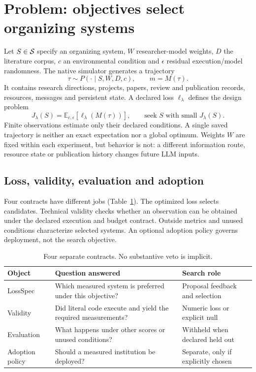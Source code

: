 \section{Problem: objectives select organizing systems}
\label{sec:problem}
Let $S\in\mathcal{S} $ specify an organizing system, $W$ researcher-model weights, $D$
the literature corpus, $ c $ an environmental condition and $\epsilon $ residual
execution/model randomness. The native simulator generates a trajectory
\begin{equation}
 \tau\sim P(\cdot\mid S,W,D,c),\qquad m=M(\tau).
\end{equation}
It contains research directions, projects, papers, review and publication
records, resources, messages and persistent state. A declared loss $\ell_\lambda $
defines the design problem
\begin{equation}
 J_\lambda(S)=\mathbb E_{c,\epsilon}[\ell_\lambda(M(\tau))],\qquad
 \text{seek }S\text{ with small }J_\lambda(S).
 \label{eq:integrated-objective}
\end{equation}
Finite observations estimate only their declared conditions. A single saved
trajectory is neither an exact expectation nor a global optimum. Weights $W$
are fixed within each experiment, but behavior is not: a different information
route, resource state or publication history changes future LLM inputs.

\subsection{Loss, validity, evaluation and adoption}
Four contracts have different jobs (Table~\ref{tab:integrated-contracts}). The
optimized loss selects candidates. Technical validity checks whether an
observation can be obtained under the declared execution and budget contract.
Outside metrics and unused conditions characterize selected systems.
An optional adoption policy governs deployment, not the search objective.

\begin{table}[t]\centering\small
\caption{Four separate contracts. No substantive veto is implicit.}
\label{tab:integrated-contracts}
\begin{tabular}{@{}>{\raggedright\arraybackslash}p{.19\linewidth}>{\raggedright\arraybackslash}p{.49\linewidth}>{\raggedright\arraybackslash}p{.22\linewidth}@{}}
\toprule
Object & Question answered & Search role \\
\midrule
LossSpec & Which measured system is preferred under this objective? & Proposal feedback and selection \\
Validity & Did literal code execute and yield the required measurements? & Numeric loss or explicit null \\
Evaluation & What happens under other scores or unused conditions? & Withheld when declared held out \\
Adoption policy & Should a measured institution be deployed? & Separate, only if explicitly chosen \\
\bottomrule
\end{tabular}\end{table}

